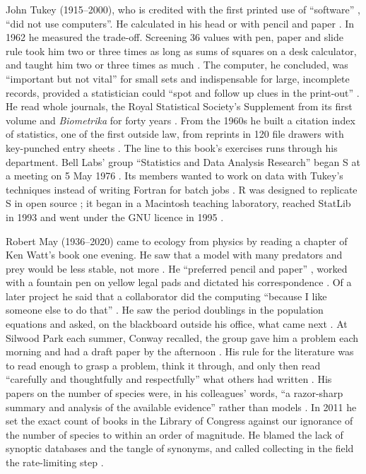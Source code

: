 John Tukey (1915--2000), who is credited with the first printed use of
``software'' \parencite{anscombe2003quietcontributor}, ``did not use
computers''. He calculated in his head or with pencil and paper
\parencite{fernholz2003remembering}. In 1962 he measured the trade-off.
Screening 36 values with pen, paper and slide rule took him two or three times
as long as sums of squares on a desk calculator, and taught him two or three
times as much \parencite{tukey1962future}. The computer, he concluded, was
``important but not vital'' for small sets and indispensable for large,
incomplete records, provided a statistician could ``spot and follow up clues in
the print-out'' \parencite{tukey1962future}. He read whole journals, the Royal
Statistical Society's Supplement from its first volume and \emph{Biometrika}
for forty years \parencite{fernholz2000conversation}. From the 1960s he built a
citation index of statistics, one of the first outside law, from reprints in
120 file drawers with key-punched entry sheets
\parencite{brillinger2002tukeylife,anscombe2003quietcontributor}. The line to
this book's exercises runs through his department. Bell Labs' group
``Statistics and Data Analysis Research'' began S at a meeting on 5 May 1976
\parencite{chambers2020srdatascience}. Its members wanted to work on data with
Tukey's techniques instead of writing Fortran for batch jobs
\parencite{becker1994historyofs}. R was designed to replicate S in open source
\parencite{chambers2020srdatascience}; it began in a Macintosh teaching
laboratory, reached StatLib in 1993 and went under the GNU licence in 1995
\parencite{ihaka1998rhistory}.

Robert May (1936--2020) came to ecology from physics by reading a chapter of
Ken Watt's book one evening. He saw that a model with many predators and prey
would be less stable, not more \parencite{williams2008mayinterview}. He
``preferred pencil and paper'' \parencite{krebs2020mayobituary}, worked with a
fountain pen on yellow legal pads and dictated his correspondence
\parencite{dobson2020mayresolution}. Of a later project he said that a
collaborator did the computing ``because I like someone else to do that''
\parencite{williams2008mayinterview}. He saw the period doublings in the
population equations and asked, on the blackboard outside his office, what came
next \parencite{williams2008mayinterview}. At Silwood Park each summer, Conway
recalled, the group gave him a problem each morning and had a draft paper by
the afternoon \parencite{smc2020may}. His rule for the literature was to read
enough to grasp a problem, think it through, and only then read ``carefully and
thoughtfully and respectfully'' what others had written
\parencite{kingsland2020hrcnewsletter}. His papers on the number of species
were, in his colleagues' words, ``a razor-sharp summary and analysis of the
available evidence'' rather than models \parencite{krebs2022maymemoir}. In 2011
he set the exact count of books in the Library of Congress against our
ignorance of the number of species to within an order of magnitude. He blamed
the lack of synoptic databases and the tangle of synonyms, and called
collecting in the field the rate-limiting step
\parencite{may2011howmanyspecies}.

